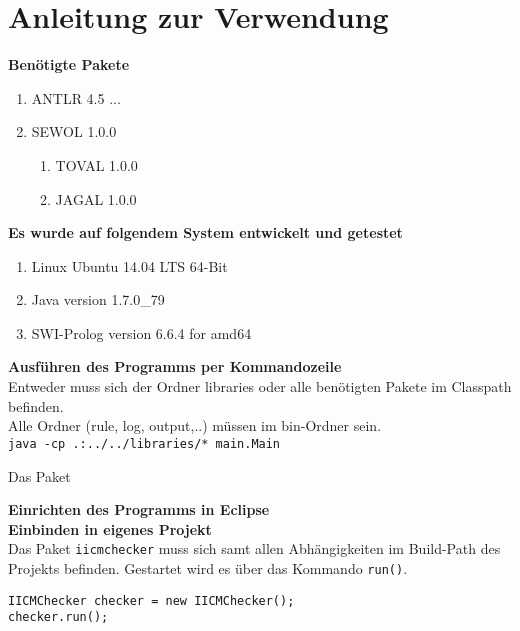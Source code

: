 
\chapter{Anleitung zur Verwendung} %

\label{UserManual} %


\textbf{Benötigte Pakete}
\begin{enumerate}
\item ANTLR 4.5 ...
\item SEWOL 1.0.0
\begin{enumerate}
\item TOVAL 1.0.0
\item JAGAL 1.0.0
\end{enumerate}
\end{enumerate}

\textbf{Es wurde auf folgendem System entwickelt und getestet}
\begin{enumerate}
\item Linux Ubuntu 14.04 LTS 64-Bit
\item Java version 1.7.0\_79
\item SWI-Prolog version 6.6.4 for amd64
\end{enumerate}

\textbf{Ausführen des Programms per Kommandozeile}\\
Entweder muss sich der Ordner libraries oder alle benötigten Pakete im Classpath befinden.\\
Alle Ordner (rule, log, output,..) müssen im bin-Ordner sein.\\

\texttt{java -cp .:../../libraries/* main.Main}



Das Paket \texttt{}

\textbf{Einrichten des Programms in Eclipse}\\


\textbf{Einbinden in eigenes Projekt}\\
Das Paket \texttt{iicmchecker} muss sich samt allen Abhängigkeiten im Build-Path des Projekts befinden. Gestartet wird es über das Kommando \texttt{run()}.\\
\begin{verbatim}
IICMChecker checker = new IICMChecker();
checker.run();
\end{verbatim}


